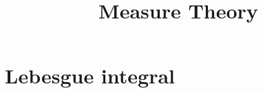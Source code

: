 \documentclass[twoside, a4paper, 10pt]{amsart}
\title[ ]{Measure Theory}
\begin{document}
\maketitle
\raggedbottom


\newcommand{\cA}{\mathcal{A}}
\newcommand{\cB}{\mathcal{B}}
\newcommand{\cC}{\mathcal{C}}
\newcommand{\cD}{\mathcal{D}}
\newcommand{\cE}{\mathcal{E}}
\newcommand{\cF}{\mathcal{F}}
\newcommand{\cG}{\mathcal{G}}
\newcommand{\cH}{\mathcal{H}}
\newcommand{\cI}{\mathcal{I}}
\newcommand{\cJ}{\mathcal{J}}
\newcommand{\cK}{\mathcal{K}}
\newcommand{\cL}{\mathcal{L}}
\newcommand{\cM}{\mathcal{M}}
\newcommand{\cN}{\mathcal{N}}
\newcommand{\cO}{\mathcal{O}}
\newcommand{\cP}{\mathcal{P}}
\newcommand{\cQ}{\mathcal{Q}}
\newcommand{\cR}{\mathcal{R}}
\newcommand{\cS}{\mathcal{S}}
\newcommand{\cT}{\mathcal{T}}
\newcommand{\cU}{\mathcal{U}}
\newcommand{\cV}{\mathcal{V}}
\newcommand{\cW}{\mathcal{W}}
\newcommand{\cX}{\mathcal{X}}
\newcommand{\cY}{\mathcal{Y}}
\newcommand{\cZ}{\mathcal{Z}}
\newcommand{\bA}{\mathbb{A}}
\newcommand{\bB}{\mathbb{B}}
\newcommand{\bC}{\mathbb{C}}
\newcommand{\bD}{\mathbb{D}}
\newcommand{\bE}{\mathbb{E}}
\newcommand{\bF}{\mathbb{F}}
\newcommand{\bG}{\mathbb{G}}
\newcommand{\bH}{\mathbb{H}}
\newcommand{\bI}{\mathbb{I}}
\newcommand{\bJ}{\mathbb{J}}
\newcommand{\bK}{\mathbb{K}}
\newcommand{\bL}{\mathbb{L}}
\newcommand{\bM}{\mathbb{M}}
\newcommand{\bN}{\mathbb{N}}
\newcommand{\bO}{\mathbb{O}}
\newcommand{\bP}{\mathbb{P}}
\newcommand{\bQ}{\mathbb{Q}}
\newcommand{\bR}{\mathbb{R}}
\newcommand{\bS}{\mathbb{S}}
\newcommand{\bT}{\mathbb{T}}
\newcommand{\bU}{\mathbb{U}}
\newcommand{\bV}{\mathbb{V}}
\newcommand{\bW}{\mathbb{W}}
\newcommand{\bX}{\mathbb{X}}
\newcommand{\bY}{\mathbb{Y}}
\newcommand{\bZ}{\mathbb{Z}}

\newcommand{\diam}{\operatorname{diam}}


 

\theoremstyle{definition}
\newtheorem{mydef}[dummy]{Definition}
\newtheorem{prop}[dummy]{Proposition}
\newtheorem{corol}[dummy]{Corollary}
\newtheorem{thm}[dummy]{Theorem}
\newtheorem{lemma}[dummy]{Lemma}
\newtheorem{eg}[dummy]{Example}
\newtheorem{notation}[dummy]{Notation}
\newtheorem{remark}[dummy]{Remark}
\newtheorem{claim}[dummy]{Claim}
\newtheorem{Exercise}[dummy]{Exercise}
\newtheorem{question}[dummy]{Question}
\newtheorem{conjecture}[dummy]{Conjecture}

\tableofcontents

\section{Lebesgue integral}
\end{document}

